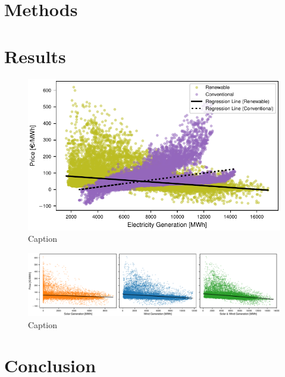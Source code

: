 \documentclass{article}
\begin{document}
\section{Methods}

\section{Results}

\begin{figure}
    \centering
    \includegraphics[width=\columnwidth]{doc/fig/ren_vs_con_regression.pdf}
    \caption{Caption}
    \label{fig:ren_vs_con_regression}
\end{figure}

\begin{figure}
    \centering
    \includegraphics[width=\columnwidth]{doc/fig/solar_wind_regression.pdf}
    \caption{Caption}
    \label{fig:solar_wind_regression}
\end{figure}

\section{Conclusion}
\end{document}
